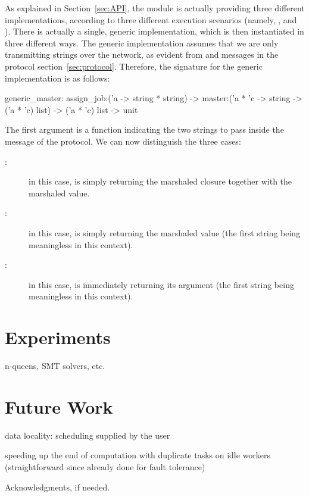 \documentclass[preprint]{sigplanconf}
\begin{document}
As explained in Section~\ref{sec:API}, the  module is
actually providing three different implementations, according to three
different execution scenarios (namely, ,  and
). There is actually a single, generic implementation, which
is then instantiated in three different ways.
The generic implementation assumes that we are only transmitting
strings over the network, as evident from  and
 messages in the protocol section~\ref{sec:protocol}.
Therefore, the signature for the generic implementation is as follows:
\begin{ocaml}
  generic_master:
    assign_job:('a -> string * string) ->
    master:('a * 'c -> string -> ('a * 'c) list)  ->
    ('a * 'c) list -> unit
\end{ocaml}
The first argument  is a function indicating 
the two strings to pass inside the  message of the protocol.
We can now distinguish the three cases:
\begin{description}
\item[:] in this case,  is simply returning
  the marshaled closure together with the marshaled value.
\item[:] in this case,  is simply
  returning the marshaled value (the first string being meaningless in
  this context).
\item[:] in this case,  is immediately
  returning its argument (the first string being meaningless in
  this context).
\end{description}

\section{Experiments}\label{sec:experiments}

n-queens, SMT solvers, etc.

\section{Future Work}\label{sec:future}

data locality: scheduling supplied by the user

speeding up the end of computation with duplicate tasks on idle workers
(straightforward since already done for fault tolerance)



\acks

Acknowledgments, if needed.


\nocite{*}


\end{document}
